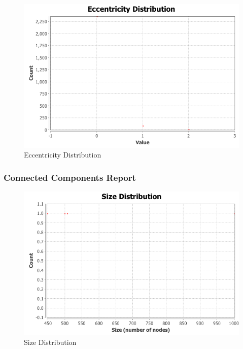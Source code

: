 \documentclass{article}
\begin{document}
\begin{figure}[H]
\centering
\includegraphics[scale=0.70]{q3/GraphDistanceReport/EccentricityDistribution}
\caption{Eccentricity Distribution}
\label{eccentricitydistribution}
\end{figure}

\subsubsection*{Connected Components Report}

\begin{figure}[H]
\centering
\includegraphics[scale=0.70]{q3/ConnectedComponentsReport/cc-size-distribution}
\caption{Size Distribution}
\label{sizedistribution}
\end{figure}
\end{document}
